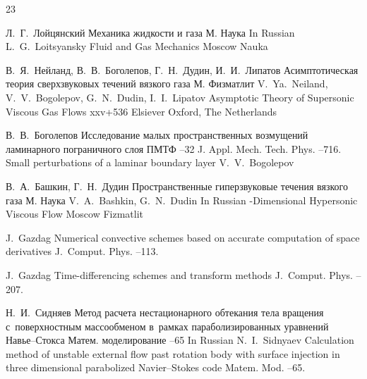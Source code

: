 \begin{thebibliography}{23}

\by Л.~Г.~Лойцянский
\book Механика жидкости и газа
\publaddr М.
\publ Наука
\transl 
\lang In Russian
\by L.~G.~Loitsyansky
\book Fluid and Gas Mechanics
\publaddr Moscow
\publ Nauka

\by В.~Я.~Нейланд, В.~В.~Боголепов, Г.~Н.~Дудин, И.~И.~Липатов
\book Асимптотическая теория сверхзвуковых течений вязкого газа
\publaddr М.
\publ Физматлит
\transl
\by  V.~Ya.~Neiland, V.~V.~Bogolepov, G.~N.~Dudin, I.~I.~Lipatov
\book Asymptotic Theory of Supersonic Viscous Gas Flows
\totalpages xxv+536
\publ Elsiever
\publaddr  Oxford, The Netherlands


\by В.~В.~Боголепов
\paper Исследование малых пространственных возмущений ламинарного пограничного слоя
\jour ПМТФ
--32
\transl
\jour J. Appl. Mech. Tech. Phys.
--716.
\paper Small perturbations of a laminar boundary layer
\by V.~V.~Bogolepov 

\by В.~А.~Башкин, Г.~Н.~Дудин
\book Пространственные гиперзвуковые течения вязкого газа
\publaddr М.
\publ Наука
\misctransl
\by V.~A.~Bashkin, G.~N.~Dudin
\lang In Russian
-Dimensional Hypersonic Viscous Flow
\publaddr Moscow
\publ Fizmatlit


\by J.~Gazdag
\paper  Numerical convective schemes based on accurate computation of space derivatives 
\jour J.~Comput. Phys.
--113.

\by J.~Gazdag
\paper  Time-differencing schemes and transform methods 
\jour J.~Comput. Phys.
--207.

\by Н.~И.~Сидняев
\paper Метод расчета нестационарного обтекания тела вращения с~поверхностным массообменом в~рамках параболизированных уравнений Навье--Стокса
\jour Матем. моделирование
--65
\misctransl
\lang In Russian
\by N.~I.~Sidnyaev
\paper Calculation method of unstable external flow past rotation body with surface injection in three dimensional parabolized Navier--Stokes code
\jour Matem. Mod.
--65.


\end{thebibliography}
